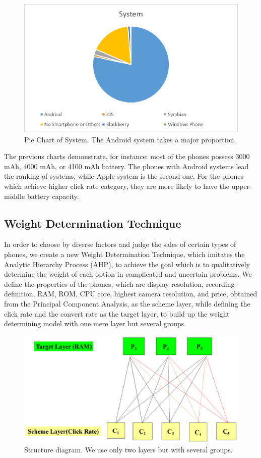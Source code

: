 \begin{figure}[!ht]
	\centering
	\includegraphics[width=360pt]{fig4.eps}
	\caption{ Pie Chart of System. The Android system takes a major proportion.}
	\label{fig4}
\end{figure}
The previous charts demonstrate, for instance: most of the phones possess 3000 mAh, 4000 mAh, or 4100 mAh battery. The phones with Android systems lead the ranking of systems, while Apple system is the second one. For the phones which achieve higher click rate category, they are more likely to have the upper-middle battery capacity. 

\subsection{Weight Determination Technique}

In order to choose by diverse factors and judge the sales of certain types of phones, we create a new Weight Determination Technique, which imitates the Analytic Hierarchy Process (AHP), to achieve the goal which is to qualitatively determine the weight of each option in complicated and uncertain problems. We define the properties of the phones, which are display resolution, recording definition, RAM, ROM, CPU core, highest camera resolution, and price, obtained from the Principal Component Analysis, as the scheme layer, while defining the click rate and the convert rate as the target layer, to build up the weight determining model with one mere layer but several groups.

\begin{figure}[!ht]
	\centering
	\includegraphics[width=360pt]{fig5.eps}
	\caption{Structure diagram. We use only two layers but with several groups.}
	\label{fig5}
\end{figure}

